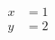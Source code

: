 \documentclass[
]{article}
\author{}
\date{}
\begin{document}
\begin{align}
x &= 1 \\
y &= 2
\end{align}
\end{document}
